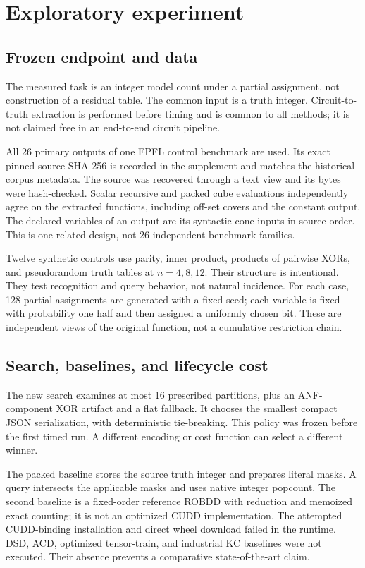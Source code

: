 \documentclass[11pt]{article}
\theoremstyle{definition}\newtheorem{definition}[theorem]{Definition}
\theoremstyle{remark}\newtheorem{remark}[theorem]{Remark}
\begin{document}
\section{Exploratory experiment}
\label{sec:experiment}
\subsection{Frozen endpoint and data}
The measured task is an integer model count under a partial assignment, not construction of a residual table. The common input is a truth integer. Circuit-to-truth extraction is performed before timing and is common to all methods; it is not claimed free in an end-to-end circuit pipeline.

All 26 primary outputs of one EPFL control benchmark are used\cite{epfl}. Its exact pinned source SHA-256 is recorded in the supplement and matches the historical corpus metadata. The source was recovered through a text view and its bytes were hash-checked. Scalar recursive and packed cube evaluations independently agree on the extracted functions, including off-set covers and the constant output. The declared variables of an output are its syntactic cone inputs in source order. This is one related design, not 26 independent benchmark families.

Twelve synthetic controls use parity, inner product, products of pairwise XORs, and pseudorandom truth tables at $n=4,8,12$. Their structure is intentional. They test recognition and query behavior, not natural incidence. For each case, 128 partial assignments are generated with a fixed seed; each variable is fixed with probability one half and then assigned a uniformly chosen bit. These are independent views of the original function, not a cumulative restriction chain.

\subsection{Search, baselines, and lifecycle cost}
The new search examines at most 16 prescribed partitions, plus an ANF-component XOR artifact and a flat fallback. It chooses the smallest compact JSON serialization, with deterministic tie-breaking. This policy was frozen before the first timed run. A different encoding or cost function can select a different winner.

The packed baseline stores the source truth integer and prepares literal masks. A query intersects the applicable masks and uses native integer popcount. The second baseline is a fixed-order reference ROBDD with reduction and memoized exact counting; it is not an optimized CUDD implementation. The attempted CUDD-binding installation and direct wheel download failed in the runtime. DSD, ACD, optimized tensor-train, and industrial KC baselines were not executed. Their absence prevents a comparative state-of-the-art claim.
\end{document}
